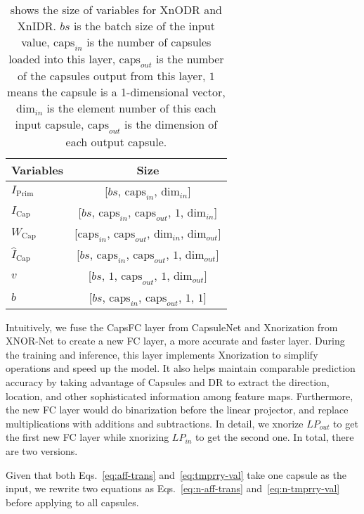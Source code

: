 \documentclass[sn-mathphys,iicol,Numbered]{sn-jnl}
\begin{document}
\begin{table}[ht]\small
\centering
\caption{shows the size of variables for XnODR and XnIDR. $bs$ is the batch size of the input value, $\text{caps}_{in}$ is the number of capsules loaded into this layer, $\text{caps}_{out}$ is the number of the capsules output from this layer, $1$ means the capsule is a 1-dimensional vector, $\text{dim}_{in}$ is the element number of this each input capsule, $\text{caps}_{out}$ is the dimension of each output capsule.}
\begin{tabular}{l|c} 
\hline
Variables & Size \\
\hline
\hline
$I_{\text{Prim}}$ & [$bs$, $\text{caps}_{in}$, $\text{dim}_{in}$] \\
$I_{\text{Cap}}$ & [$bs$, $\text{caps}_{in}$, $\text{caps}_{out}$, $1$, $\text{dim}_{in}$]  \\
$W_{\text{Cap}}$ & [$\text{caps}_{in}$, $\text{caps}_{out}$, $\text{dim}_{in}$, $\text{dim}_{out}$] \\
$\hat{I}_{\text{Cap}}$ & [$bs$, $\text{caps}_{in}$, $\text{caps}_{out}$, $1$, $\text{dim}_{out}$] \\
$v$       & [$bs$, $1$, $\text{caps}_{out}$, $1$, $\text{dim}_{out}$] \\
$b$       & [$bs$, $\text{caps}_{in}$, $\text{caps}_{out}$, $1$, $1$] \\
\hline
\end{tabular}
\vspace{-0.3cm}
\label{tab:4}
\end{table}

Intuitively, we fuse the CapsFC layer from CapsuleNet and Xnorization from XNOR-Net to create a new FC layer, a more accurate and faster layer. During the training and inference, this layer implements Xnorization to simplify operations and speed up the model. It also helps maintain comparable prediction accuracy by taking advantage of Capsules and DR to extract the direction, location, and other sophisticated information among feature maps. Furthermore, the new FC layer would do binarization before the linear projector, and replace multiplications with additions and subtractions. In detail, we xnorize $LP_{out}$ to get the first new FC layer while xnorizing $LP_{in}$ to get the second one. In total, there are two versions.

Given that both Eqs.~\ref{eq:aff-trans} and~\ref{eq:tmprry-val} take one capsule as the input, we rewrite two equations as Eqs.~\ref{eq:n-aff-trans} and~\ref{eq:n-tmprry-val} before applying to all capsules.
\end{document}

